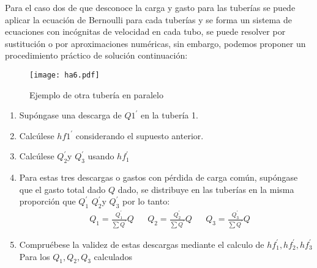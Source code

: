 Para el caso dos de que desconoce la carga y gasto para las tuberías se puede aplicar la ecuación de Bernoulli para cada tuberías y se forma un sistema de ecuaciones con incógnitas de velocidad en cada tubo, se puede resolver por sustitución o por aproximaciones numéricas, sin embargo, podemos proponer un procedimiento práctico de solución continuación:
\begin{figure}[h!]
\centering
  \texttt{[image: ha6.pdf]}
  \caption{Ejemplo de otra tubería en paralelo}
  \label{ha6}
\end{figure}    
\begin{enumerate}
    \item Supóngase una descarga de $Q1^{\prime}$ en la tubería 1.
    \item Calcúlese $hf1 ^{\prime}$ considerando el supuesto anterior.
    \item Calcúlese $Q_2^{\prime}$y $Q_3^{\prime}$ usando $hf_1^{\prime}$
    \item Para estas tres descargas o gastos con pérdida de carga común, supóngase que el gasto total dado $Q$ dado, se distribuye en las tuberías en la misma proporción que $Q_1^{\prime}$ $Q_2^{\prime}$y $Q_3^{\prime}$ por lo tanto:
    \begin{align*}
        &Q_1 = \frac{Q_1^{\prime}}{\sum Q^{\prime}}Q&&Q_2 = \frac{Q_2^{\prime}}{\sum Q^{\prime}}Q&&Q_3 = \frac{Q_3^{\prime}}{\sum Q^{\prime}}Q
    \end{align*}
    \item Compruébese la validez de estas descargas mediante el calculo de $hf_1^{\prime}, hf_2^{\prime}, hf_3^{\prime}$ Para los $Q_1, Q_2, Q_3$ calculados 
\end{enumerate}

